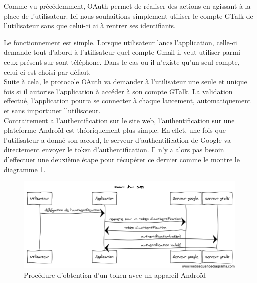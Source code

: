 Comme vu précédemment, OAuth permet de réaliser des actions en agissant à la place de l'utilisateur. 
Ici nous souhaitions simplement utiliser le compte GTalk de l'utilisateur sans que celui-ci ai à rentrer
ses identifiants. 

Le fonctionnement est simple. Lorsque utilisateur lance l'application, celle-ci demande tout d'abord
à l'utilisateur quel compte Gmail il veut utiliser parmi ceux présent sur sont téléphone. Dans le cas
ou il n'existe qu'un seul compte, celui-ci est choisi par défaut.
\\


Suite à cela, le protocole OAuth va demander à l'utilisateur une seule et unique fois si il autorise 
l'application à accéder à son compte GTalk. La validation effectué, l'application pourra se connecter 
à chaque lancement, automatiquement et sans importuner l'utilisateur. 
\\


Contrairement a l'authentification sur le site web, l'authentification sur une plateforme Androïd est
théoriquement plus simple. En effet, une fois que l'utilisateur a donné son accord, le serveur 
d'authentification de Google va directement envoyer le token d'authentification. Il n'y a alors pas 
besoin d'effectuer une deuxième étape pour récupérer ce dernier comme le montre le diagramme 
\ref{obtention-token-avec-android}.



\begin{figure}[!h]
	\center
	\includegraphics[width=15cm]{img/obtention-token-avec-android.png}
	\caption{Procédure d'obtention d'un token avec un appareil Androïd}
	\label{obtention-token-avec-android}
\end{figure}


